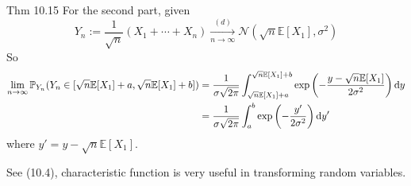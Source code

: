 \begin{note}{Thm 10.15}
    For the second part, given 
    \[
    Y_n:=\frac{1}{\sqrt{n}}(X_1+\cdots +X_n)\xrightarrow[n\to\infty]{(d)}\mathcal{N}(\sqrt{n}\mathbb{E}[X_1],\sigma^2)
    \]
    So
    \[
    \begin{aligned}
    \lim_{n\to\infty}\mathbb{P}_{Y_n}(Y_n\in [\sqrt{n}\mathbb{E}[X_1]+a, \sqrt{n}\mathbb{E}[X_1]+b])
    &=\frac{1}{\sigma\sqrt{2\pi}}\int_{\sqrt{n}\mathbb{E}[X_1]+a}^{\sqrt{n}\mathbb{E}[X_1]+b}\exp\left(-\frac{y-\sqrt{n}\mathbb{E}[X_1]}{2\sigma^2}\right)\mathop{}\!\mathrm{d} y\\
    &=\frac{1}{\sigma\sqrt{2\pi}}\int_a^b \exp\left(-\frac{y'}{2\sigma^2}\right)\mathop{}\!\mathrm{d} y'
    \end{aligned}
    \]
    where $y'=y-\sqrt{n}\mathbb{E}[X_1]$. 

    See (10.4), characteristic function is very useful in transforming random variables.
\end{note}